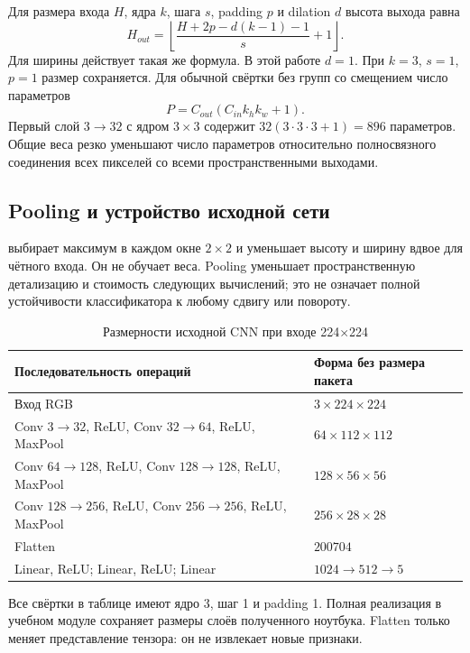 Для размера входа \(H\), ядра \(k\), шага \(s\), padding \(p\) и dilation \(d\) высота выхода равна
\begin{equation}
H_{out}=\left\lfloor\frac{H+2p-d(k-1)-1}{s}+1\right\rfloor.
\end{equation}
Для ширины действует такая же формула. В этой работе \(d=1\). При \(k=3\), \(s=1\), \(p=1\) размер сохраняется. Для обычной свёртки без групп со смещением число параметров
\begin{equation}
P=C_{out}(C_{in}k_hk_w+1).
\end{equation}
Первый слой \(3\to32\) с ядром \(3\times3\) содержит \(32(3\cdot3\cdot3+1)=896\) параметров. Общие веса резко уменьшают число параметров относительно полносвязного соединения всех пикселей со всеми пространственными выходами.

\subsection{Pooling и устройство исходной сети}
 выбирает максимум в каждом окне \(2\times2\) и уменьшает высоту и ширину вдвое для чётного входа. Он не обучает веса. Pooling уменьшает пространственную детализацию и стоимость следующих вычислений; это не означает полной устойчивости классификатора к любому сдвигу или повороту.

\begin{table}[H]\centering\small
\caption{Размерности исходной CNN при входе 224\(\times\)224}
\begin{tabularx}{\textwidth}{@{}p{}Y@{}}
\toprule
Последовательность операций & Форма без размера пакета \\
\midrule
Вход RGB & \(3\times224\times224\) \\
Conv \(3\to32\), ReLU, Conv \(32\to64\), ReLU, MaxPool & \(64\times112\times112\) \\
Conv \(64\to128\), ReLU, Conv \(128\to128\), ReLU, MaxPool & \(128\times56\times56\) \\
Conv \(128\to256\), ReLU, Conv \(256\to256\), ReLU, MaxPool & \(256\times28\times28\) \\
Flatten & \(200704\) \\
Linear, ReLU; Linear, ReLU; Linear & \(1024\to512\to5\) \\
\bottomrule
\end{tabularx}\end{table}

Все свёртки в таблице имеют ядро 3, шаг 1 и padding 1. Полная реализация  в учебном модуле сохраняет размеры слоёв полученного ноутбука. Flatten только меняет представление тензора: он не извлекает новые признаки.


